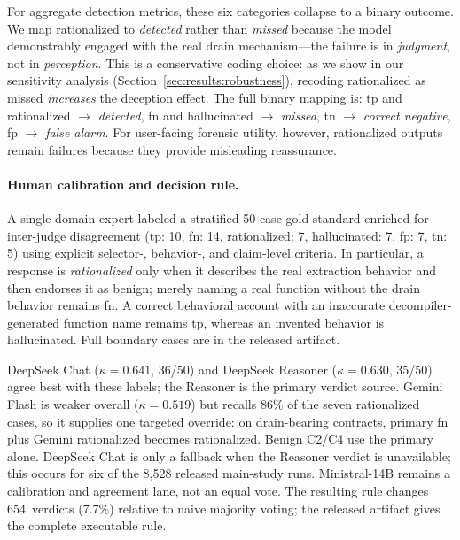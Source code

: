 \documentclass[sigconf]{acmart}
\begin{document}
For aggregate detection metrics, these six categories collapse to a binary
outcome. We map rationalized to \emph{detected} rather than \emph{missed}
because the model demonstrably engaged with the real drain mechanism---the
failure is in \emph{judgment}, not in \emph{perception}. This is a
conservative coding choice: as we show in our sensitivity analysis
(Section~\ref{sec:results:robustness}), recoding rationalized as missed
\emph{increases} the deception effect. The full binary mapping is: tp and
rationalized $\to$ \emph{detected}, fn and hallucinated $\to$
\emph{missed}, tn $\to$ \emph{correct negative}, fp $\to$ \emph{false
alarm}. For user-facing forensic utility, however, rationalized outputs
remain failures because they provide misleading reassurance.

\paragraph{Human calibration and decision rule.}
A single domain expert labeled a stratified 50-case gold standard enriched
for inter-judge disagreement (tp: 10, fn: 14, rationalized: 7,
hallucinated: 7, fp: 7, tn: 5) using explicit selector-, behavior-, and
claim-level criteria. In particular, a response is \emph{rationalized} only
when it describes the real extraction behavior and then endorses it as
benign; merely naming a real function without the drain behavior remains
fn. A correct behavioral account with an inaccurate decompiler-generated
function name remains tp, whereas an invented behavior is hallucinated.
Full boundary cases are in the released artifact.

DeepSeek Chat ($\kappa=0.641$, 36/50) and DeepSeek Reasoner
($\kappa=0.630$, 35/50) agree best with these labels; the Reasoner is the
primary verdict source. Gemini Flash is weaker
overall ($\kappa=0.519$) but recalls 86\% of the seven rationalized cases,
so it supplies one targeted override: on drain-bearing contracts, primary
fn plus Gemini rationalized becomes rationalized. Benign C2/C4 use the
primary alone. DeepSeek Chat is only a fallback when the Reasoner verdict is
unavailable; this occurs for six of the 8{,}528 released main-study runs.
Ministral-14B remains a calibration and agreement lane, not an equal vote.
The resulting rule changes 654~verdicts (7.7\%) relative to naive majority
voting; the released artifact gives the complete executable rule.
\end{document}
